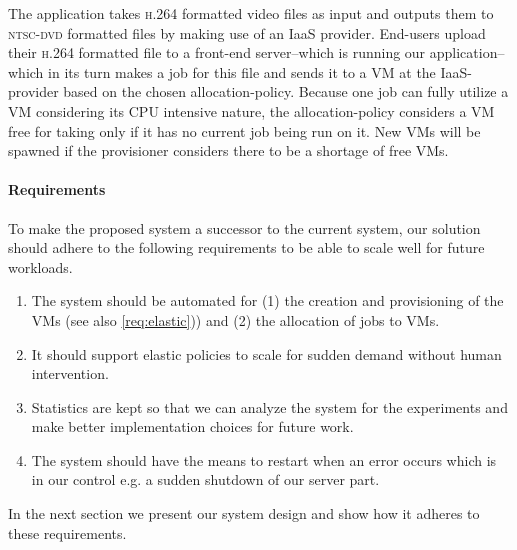 The application takes \textsc{h.264} formatted video files as
input and outputs them to \textsc{ntsc-dvd} formatted files by making
use of an IaaS provider. End-users upload their \textsc{h.264}
formatted file to a front-end server--which is running our
application--which in its turn makes a job for this file and sends it
to a VM at the IaaS-provider based on the chosen
allocation-policy. Because one job can fully utilize a VM considering
its \textsc{CPU} intensive nature, the allocation-policy considers a
VM free for taking only if it has no current job being run on it. New
VMs will be spawned if the provisioner considers there to be a
shortage of free VMs.

\paragraph{Requirements}
To make the proposed system a successor to the current system, our
solution should adhere to the following requirements to be able to
scale well for future workloads.

\begin{enumerate}[i]
\item The system should be automated for (1) the creation and
  provisioning of the VMs (see also \ref{req:elastic})) and (2)
  the allocation of jobs to VMs.
\item \label{req:elastic} It should support elastic policies to
  scale for sudden demand without human intervention.
\item Statistics are kept so that we can analyze the system for the
  experiments and make better implementation choices for future work.
\item The system should have the means to restart when an error occurs
  which is in our control e.g. a sudden shutdown of our server part.
\end{enumerate}

In the next section we present our system design and show how it adheres
to these requirements.

